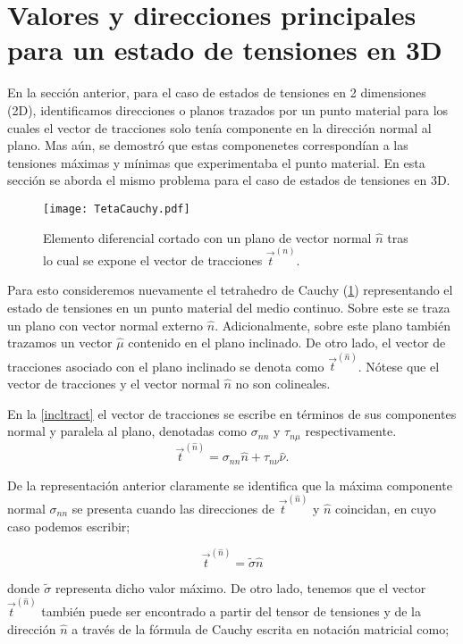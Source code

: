 \documentclass[../notas medios.tex]{subfiles}
\begin{document}
\section{Valores y direcciones principales para un estado de tensiones en 3D}
En la sección anterior, para el caso de estados de tensiones en 2 dimensiones (2D), identificamos direcciones o planos trazados por un punto material para los cuales el vector de tracciones solo tenía componente en la dirección normal al plano. Mas aún, se demostró que estas componenetes correspondían a las tensiones máximas y mínimas que experimentaba el punto material. En esta sección se aborda el mismo problema para el caso de estados de tensiones en 3D.  
%
\begin{figure}[H]
\centering
	\texttt{[image: TetaCauchy.pdf]}
	\caption{Elemento diferencial cortado con un plano de vector normal $\hat{n}$ tras lo cual se expone el vector de tracciones ${{\vec t}^{(n)}}$.}
	\label{TetaCauchy}
\end{figure}

Para esto consideremos nuevamente el tetrahedro de Cauchy (\cref{TetaCauchy}) representando el estado de tensiones en un punto material del medio continuo. Sobre este se traza un plano con vector normal externo $\hat{n}$. Adicionalmente, sobre este plano también trazamos un vector ${\hat \mu }$ contenido en el plano inclinado. De otro lado, el vector de tracciones asociado con el plano inclinado se denota como ${\vec t^{(\hat n)}}$. Nótese que el vector de tracciones y el vector normal $\hat{n}$ no son colineales.

En la \cref{incltract} el vector de tracciones se escribe en términos de sus componentes normal y paralela al plano, denotadas como ${\sigma _{nn}}$ y ${\tau _{n\mu }}$ respectivamente.
%
\begin{equation}
{{\vec t}^{(\hat n)}} = {\sigma _{nn}}\hat n + {\tau _{n\nu }}\hat \nu.
\label{incltract}
\end{equation}

De la representación anterior claramente se identifica que la máxima componente normal ${\sigma _{nn}}$ se presenta cuando las direcciones de ${\vec t^{(\hat n)}}$ y $\hat{n}$ coincidan, en cuyo caso podemos escribir;

\begin{equation}
{{\vec t}^{(\hat n)}} = \tilde \sigma \hat n
\label{Cauchyescalar}
\end{equation}

donde ${\tilde \sigma }$ representa dicho valor máximo. De otro lado, tenemos que el vector ${\vec t^{(\hat n)}}$ también puede ser encontrado a partir del tensor de tensiones y de la dirección $\hat{n}$ a través de la fórmula de Cauchy escrita en notación matricial como;
\end{document}
